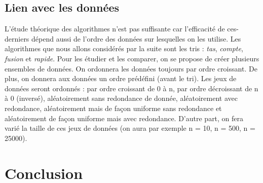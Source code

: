 \documentclass[11pt,a4paper]{article}
\begin{document}
\subsection{Lien avec les données}
L’étude théorique des algorithmes n’est pas suffisante car l’efficacité de ces-derniers dépend
aussi de l’ordre des données sur lesquelles on les utilise. Les algorithmes que nous allons considérés
par la suite sont les tris :  \textit{tas}, \textit{compte}, \textit{fusion} et \textit{rapide}. Pour les étudier et les
comparer, on se propose de créer plusieurs ensembles de données.
On ordonnera les données toujours par ordre croissant. De plus, on donnera aux données un
ordre prédéfini (avant le tri). Les jeux de données seront ordonnés : par ordre croissant de 0 à n,
par ordre décroissant de n à 0 (inversé), aléatoirement sans redondance de donnée, aléatoirement
avec redondance, aléatoirement mais de façon uniforme sans redondance et aléatoirement de façon
uniforme mais avec redondance. D’autre part, on fera varié la taille de ces jeux de données (on
aura par exemple n = 10, n = 500, n = 25000).

\section{Conclusion}
\end{document}
